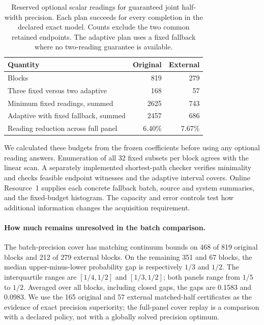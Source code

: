 \documentclass[12pt]{article}
\begin{document}
\begin{table}[htbp]\centering\small
\caption{Reserved optional scalar readings for guaranteed joint half-width
precision. Each plan succeeds for every completion in the declared exact
model. Counts exclude the two common retained endpoints. The adaptive plan
uses a fixed fallback where no two-reading guarantee is available.}
\label{tab:minimum-reading-budget}
\begin{tabular}{lrr}\toprule
Quantity & Original & External\\\midrule
Blocks & 819 & 279\\
Three fixed versus two adaptive & 168 & 57\\
Minimum fixed readings, summed & 2625 & 743\\
Adaptive with fixed fallback, summed & 2457 & 686\\
Reading reduction across full panel & 6.40\% & 7.67\%\\\bottomrule
\end{tabular}
\end{table}

We calculated these budgets from the frozen coefficients before using any
optional reading answers.
Enumeration of all 32 fixed subsets per block agrees with the linear scan.
A separately implemented shortest-path checker verifies minimality and
checks feasible endpoint witnesses and the adaptive interval covers.
Online Resource~1 supplies each concrete fallback batch, source and system
summaries, and the fixed-budget histogram. The capacity and error controls
test how additional information changes the acquisition requirement.
\paragraph{How much remains unresolved in the batch comparison.}
The batch-precision cover has matching continuum bounds on 468 of 819 original
blocks and 212 of 279 external blocks. On the remaining 351 and 67 blocks,
the median upper-minus-lower probability gap is respectively $1/3$ and $1/2$.
The interquartile ranges are $[1/4,1/2]$ and $[1/3,1/2]$; both panels range
from $1/5$ to $1/2$. Averaged over all blocks, including closed gaps, the gaps
are 0.1583 and 0.0983. We use the 165 original and 57 external matched-half certificates as the evidence
of exact precision superiority; the full-panel cover replay is a comparison
with a declared policy, not with a globally solved precision optimum.
\end{document}
